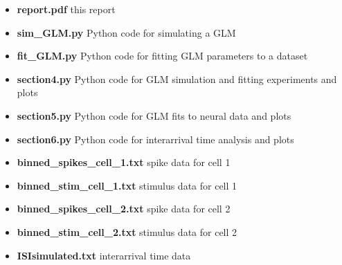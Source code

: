 \documentclass[letterpaper,titlepage,10pt]{article}
\begin{document}
\begin{itemize}
\item \textbf{report.pdf} this report
\item \textbf{sim\_GLM.py} Python code for simulating a GLM
\item \textbf{fit\_GLM.py} Python code for fitting GLM parameters to a dataset
\item \textbf{section4.py} Python code for GLM simulation and fitting experiments and plots
\item \textbf{section5.py} Python code for GLM fits to neural data and plots
\item \textbf{section6.py} Python code for interarrival time analysis and plots
\item \textbf{binned\_spikes\_cell\_1.txt} spike data for cell 1
\item \textbf{binned\_stim\_cell\_1.txt} stimulus data for cell 1
\item \textbf{binned\_spikes\_cell\_2.txt} spike data for cell 2
\item \textbf{binned\_stim\_cell\_2.txt} stimulus data for cell 2
\item \textbf{ISIsimulated.txt} interarrival time data
\end{itemize}
\end{document}
